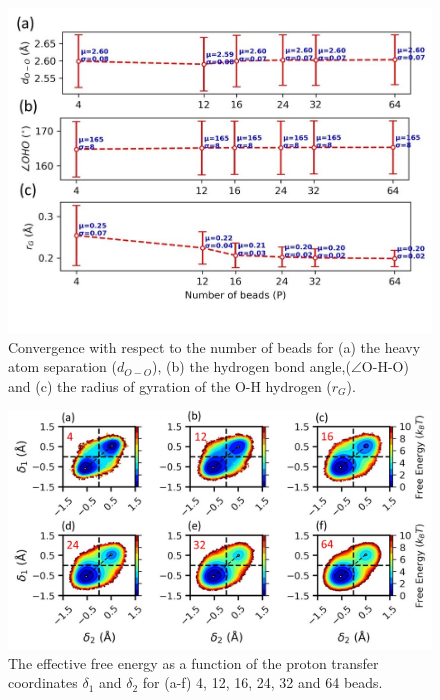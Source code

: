 \begin{figure}
    \centering
    \includegraphics[width=15cm ]{./Appendix4/new_figures_si/figure8.jpg}
    \caption{Convergence with respect to the number of beads for (a) the heavy atom separation ($d_{O-O}$), (b) the hydrogen bond angle,($\angle$O-H-O) and (c) the radius of gyration of the O-H hydrogen ($r_G$).}
    \label{fig:cip8}
\end{figure}

\begin{figure}
    \centering
    \includegraphics[width=15cm ]{./Appendix4/new_figures_si/figure9.jpg}
    \caption{The effective free energy as a function of the proton transfer
coordinates $\delta_1$ and $\delta_2$ for (a-f) 4, 12, 16, 24, 32 and 64 beads.}
    \label{fig:cip9}
\end{figure}

